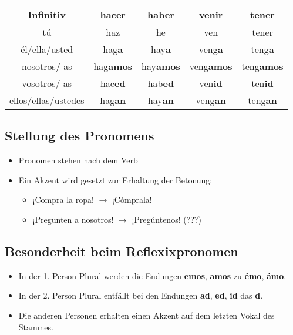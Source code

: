 \begin{tabular}{ccccc}
\hline
Infinitiv               & hacer            & haber            & venir             & tener               \\
\hline
tú                      & haz              & he               & ven               & tener               \\
él/ella/usted           & hag\textbf{a}    & hay\textbf{a}    & veng\textbf{a}    & teng\textbf{a}      \\
nosotros/-as            & hag\textbf{amos} & hay\textbf{amos} & veng\textbf{amos} & teng\textbf{amos}   \\
vosotros/-as            & hac\textbf{ed}   & hab\textbf{ed}   & ven\textbf{id}    & ten\textbf{id}      \\
ellos/ellas/ustedes     & hag\textbf{an}   & hay\textbf{an}   & veng\textbf{an}   & teng\textbf{an}     \\
\hline
\end{tabular}

\subsection*{Stellung des Pronomens}
\begin{itemize}
    \item Pronomen stehen nach dem Verb
    \item Ein Akzent wird gesetzt zur Erhaltung der Betonung:
    \begin{itemize}
        \item ¡Compra la ropa! $\rightarrow$ ¡Cómprala!
        \item ¡Pregunten a nosotros! $\rightarrow$ ¡Pregúntenos! (???)
    \end{itemize}
\end{itemize}


\subsection*{Besonderheit beim Reflexixpronomen}
\begin{itemize}
    \item In der 1. Person Plural werden die Endungen \textbf{emos}, \textbf{amos} zu \textbf{émo}, \textbf{ámo}.
    \item In der 2. Person Plural entfällt bei den Endungen \textbf{ad}, \textbf{ed}, \textbf{id} das \textbf{d}.
    \item Die anderen Personen erhalten einen Akzent auf dem letzten Vokal des Stammes.
\end{itemize}

